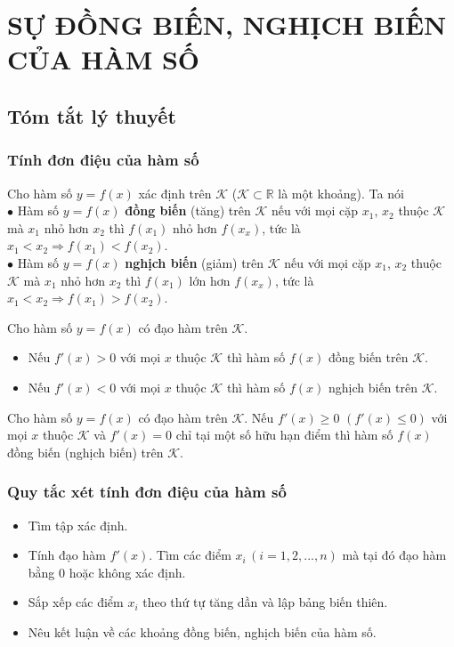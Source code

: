 \section{SỰ ĐỒNG BIẾN, NGHỊCH BIẾN CỦA HÀM SỐ}
	\subsection{Tóm tắt lý thuyết}
	\subsubsection{Tính đơn điệu của hàm số}
	\begin{dn}
		Cho hàm số $y = f(x)$ xác định trên $\mathscr{K}$ ($\mathscr{K}\subset\mathbb{R}$ là một khoảng). Ta nói \\
		$\bullet$ Hàm số $y = f(x)$ \textbf{đồng biến} (tăng) trên $\mathscr{K}$ nếu với mọi cặp $x_1$, $x_2$ thuộc $\mathscr{K}$ mà $x_1$ nhỏ hơn $x_2$ thì $f\left(x_1 \right)$ nhỏ hơn $f\left(x_x \right)$, tức là $x_1 < x_2 \Rightarrow f\left(x_1 \right) < f\left(x_2 \right)$. \\
		$\bullet$ Hàm số $y = f(x)$ \textbf{nghịch biến} (giảm) trên $\mathscr{K}$ nếu với mọi cặp $x_1$, $x_2$ thuộc $\mathscr{K}$ mà $x_1$ nhỏ hơn $x_2$ thì $f\left(x_1 \right)$ lớn hơn $f\left(x_x \right)$, tức là $x_1 < x_2 \Rightarrow f\left(x_1 \right) > f\left(x_2 \right)$.
	\end{dn}
	\begin{dl}
		Cho hàm số $y = f(x)$ có đạo hàm trên $\mathscr{K}$. 
\begin{itemize}
	 \item Nếu $f'(x) > 0$ với mọi $x$ thuộc $\mathscr{K}$ thì hàm số $f(x)$ đồng biến trên $\mathscr{K}$. 
	\item Nếu $f'(x) < 0$ với mọi $x$ thuộc $\mathscr{K}$ thì hàm số $f(x)$ nghịch biến trên $\mathscr{K}$.
\end{itemize}
	\end{dl}
	\begin{dl}
		Cho hàm số $y = f(x)$ có đạo hàm trên $\mathscr{K}$.  
 Nếu $f'(x) \geq 0$ $\left(f'(x) \leq 0 \right)$ với mọi $x$ thuộc $\mathscr{K}$ và $f'(x) = 0$ chỉ tại một số hữu hạn điểm thì hàm số $f(x)$ đồng biến (nghịch biến) trên $\mathscr{K}$.\end{dl}
	\subsubsection{Quy tắc xét tính đơn điệu của hàm số}
	\begin{itemize}
		\item	Tìm tập xác định.
		\item	Tính đạo hàm $f'(x)$. Tìm các điểm $x_i \,(i = 1, 2, ..., n)$ mà tại đó đạo hàm bằng $0$ hoặc không xác định.
		\item	Sắp xếp các điểm $x_i$ theo thứ tự tăng dần và lập bảng biến thiên.
		\item	Nêu kết luận về các khoảng đồng biến, nghịch biến của hàm số.
	\end{itemize}
	
